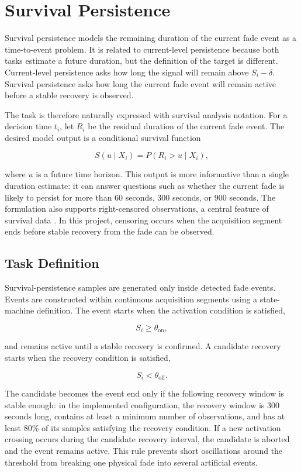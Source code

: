 \section{Survival Persistence}
\label{sec:survival-formulation}
Survival persistence models the remaining duration of the current fade event as
a time-to-event problem. It is related to current-level persistence because both
tasks estimate a future duration, but the definition of the target is different.
Current-level persistence asks how long the signal will remain above
\(S_i-\delta\). Survival persistence asks how long the current fade event will
remain active before a stable recovery is observed.

The task is therefore naturally expressed with survival analysis notation. For
a decision time \(t_i\), let \(R_i\) be the residual duration of the current fade
event. The desired model output is a conditional survival function

\[
  S(u \mid X_i) = P(R_i > u \mid X_i),
\]

where \(u\) is a future time horizon. This output is more informative than a
single duration estimate: it can answer questions such as whether the current
fade is likely to persist for more than 60 seconds, 300 seconds, or 900 seconds.
The formulation also supports right-censored observations, a central feature of
survival data \cite{keiding2015survival}. In this project, censoring occurs when
the acquisition segment ends before stable recovery from the fade can be
observed.

\subsection{Task Definition}
Survival-persistence samples are generated only inside detected fade events.
Events are constructed within continuous acquisition segments using a
state-machine definition. The event starts when the activation condition is
satisfied,

\[
  S_i \ge \theta_{\text{on}},
\]

and remains active until a stable recovery is confirmed. A candidate recovery
starts when the recovery condition is satisfied,

\[
  S_i < \theta_{\text{off}}.
\]

The candidate becomes the event end only if the following recovery window is
stable enough: in the implemented configuration, the recovery window is
300 seconds long, contains at least a minimum number of observations, and has at
least 80\% of its samples satisfying the recovery condition. If a new activation
crossing occurs during the candidate recovery interval, the candidate is
aborted and the event remains active. This rule prevents short oscillations
around the threshold from breaking one physical fade into several artificial
events.

